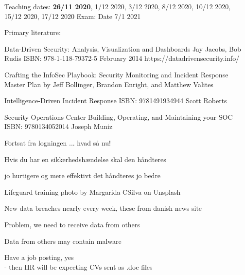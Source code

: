 \documentclass[Screen16to9,17pt]{foils}
\begin{document}

Teaching dates: {\bf 26/11 2020}, 1/12 2020, 3/12 2020, 8/12 2020, 10/12 2020, 15/12 2020, 17/12 2020
Exam: Date 7/1 2021

Primary literature:
\begin{list2}
\item Data-Driven Security: Analysis, Visualization and Dashboards Jay Jacobs, Bob Rudis ISBN: 978-1-118-79372-5 February 2014 https://datadrivensecurity.info/
\item Crafting the InfoSec Playbook: Security Monitoring and Incident Response Master Plan by Jeff Bollinger, Brandon Enright, and Matthew Valites
\item Intelligence-Driven Incident Response ISBN: 9781491934944 Scott Roberts
\item Security Operations Center Building, Operating, and Maintaining your SOC ISBN: 9780134052014 Joseph Muniz
\end{list2}

{\footnotesize
{}

}



\begin{list2}
\item Fortsat fra logningen ... hvad så nu!
\item Hvis du har en sikkerhedshændelse skal den håndteres
\item jo hurtigere og mere effektivt det håndteres jo bedre
\end{list2}

Lifeguard training photo by Margarida CSilva on Unsplash



New data breaches nearly every week, these from danish news site 

Problem, we need to receive data from others

Data from others may contain malware

Have a job posting, yes\\
- then HR will be expecting CVs sent as .doc files
\end{document}
